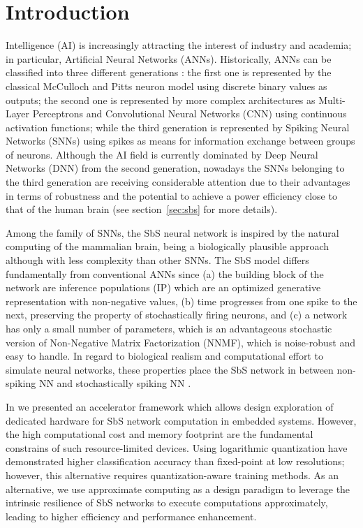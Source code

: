 
\section{Introduction}
\label{sec:introduction}
 Intelligence (AI) is increasingly attracting the interest of industry and academia; in particular,  Artificial Neural Networks (ANNs). Historically, ANNs can be classified into three different generations \cite{Design_Exploration_SbS_Trans20}: the first one is represented by the classical McCulloch and Pitts neuron model using discrete binary values as outputs; the second one is represented by more complex architectures as Multi-Layer Perceptrons and Convolutional Neural Networks (CNN) using continuous activation functions; while the third generation is represented by Spiking Neural Networks (SNNs) using spikes as means for information exchange between groups of neurons. Although the AI field is currently dominated by Deep Neural Networks (DNN) from the second generation, nowadays the SNNs belonging to the third generation are receiving considerable attention \cite{Spinnaker_Trans13,ernst2007efficient,Design_Exploration_SbS_Trans20, SNN_Survey_Trans19} due to their advantages in terms of robustness and the
potential to achieve a power efficiency close to that of the human
brain (see section~\ref{sec:sbs} for more details).

Among the family of SNNs, the SbS neural network \cite{ernst2007efficient} is inspired by the natural computing of the mammalian brain, being a biologically plausible approach although with less complexity than other SNNs. The SbS model differs fundamentally from conventional ANNs since (a) the building block of the network are inference populations (IP) which are an optimized generative representation with non-negative values, (b) time progresses from one spike to the next, preserving the property of stochastically firing neurons, and (c) a network has only a small number of parameters, which is an advantageous stochastic version of Non-Negative Matrix Factorization (NNMF), which is noise-robust and easy to handle. In regard to biological realism and computational effort to simulate neural networks, these properties place the SbS network in between non-spiking NN and stochastically spiking NN \cite{rotermund2019Backpropagation}.

In \cite{nevarez2020accelerator} we presented an accelerator framework which allows design exploration of dedicated hardware for SbS network computation in embedded systems. However, the high computational cost and memory footprint are the fundamental constrains of such resource-limited devices. Using logarithmic quantization have demonstrated higher classification accuracy than fixed-point at low resolutions; however, this alternative requires quantization-aware training methods. As an alternative, we use approximate computing as a design paradigm to leverage the intrinsic resilience of SbS networks to execute computations approximately, leading to higher efficiency and performance enhancement.

